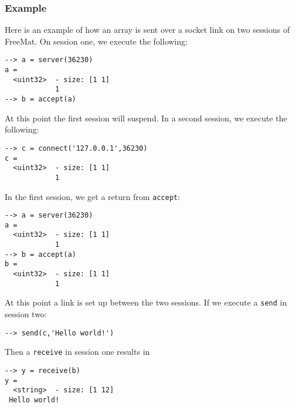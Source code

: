 \subsubsection{Example}
Here is an example of how an array is sent over a socket link on two sessions of FreeMat.  On session one, we execute the following:
\begin{verbatim}
--> a = server(36230)
a =
  <uint32>  - size: [1 1]
            1
--> b = accept(a)
\end{verbatim}
At this point the first session will suspend.  In a second session, we execute the following:
\begin{verbatim}
--> c = connect('127.0.0.1',36230)
c =
  <uint32>  - size: [1 1]
            1
\end{verbatim}
In the first session, we get a return from \verb|accept|:
\begin{verbatim}
--> a = server(36230)
a =
  <uint32>  - size: [1 1]
            1
--> b = accept(a)
b =
  <uint32>  - size: [1 1]
            1
\end{verbatim}
At this point a link is set up between the two sessions.  If we execute a \verb|send| in session two:
\begin{verbatim}
--> send(c,'Hello world!')
\end{verbatim}
Then a \verb|receive| in session one results in
\begin{verbatim}
--> y = receive(b)
y =
  <string>  - size: [1 12]
 Hello world!
\end{verbatim}

